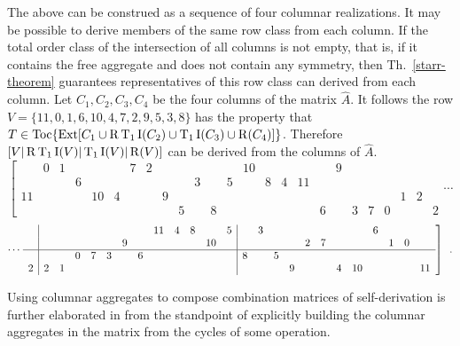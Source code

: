 \begin{example}
    The above can be construed as a sequence of four columnar realizations. It may be possible to derive members of the same row class from each column. If the total order class of the intersection of all columns is not empty, that is, if it contains the free aggregate and does not contain any symmetry, then Th.~\ref{starr-theorem} guarantees representatives of this row class can derived from each column. Let $C_1, C_2, C_3, C_4$ be the four columns of the matrix $\hat{A}$. It follows the row $V = \{ 11, 0, 1, 6, 10, 4, 7, 2, 9, 5, 3, 8 \}$ has the property that $T \in \operatorname{Toc} \{ \operatorname{Ext}[ C_1 \cup \operatorname{R}\operatorname{T}_1\operatorname{I}(C_2) \cup \operatorname{T}_1\operatorname{I}(C_3) \cup \operatorname{R}(C_4) ] \}$. Therefore $[V | \operatorname{R}\operatorname{T}_1\operatorname{I}(V) | \operatorname{T}_1\operatorname{I}(V) | \operatorname{R}(V)]$ can be derived from the columns of $\hat{A}$.
    \begin{equation*}
        \left[
        \begin{array}{cccccccccccc|cccccccccccc|c}
            & 0 & 1 &&&& 7 & 2 &&&& && 10 &&&&& 9 &&&&& & \\
            &&& 6 &&&&&&& 3 & & 5 && 8 & 4 & 11 &&&&&&& & \\
            \hline
            11 &&&& 10 & 4 &&& 9 &&& &&&&&&&&&&& 1 & 2 & \\
            &&&&&&&&& 5 && 8 &&&&&& 6 && 3 & 7 & 0 && & 2
        \end{array}
        \right. \cdots
    \end{equation*}
    \begin{equation}
        \cdots \left.
        \begin{array}{c|cccccccccccc|cccccccccccc}
            & &&&&&&& 11 & 4 & 8 && 5 && 3 &&&&&&& 6 &&& \\
            & &&&&& 9 &&&&& 10 & &&&&& 2 & 7 &&&& 1 & 0 & \\
            \hline
            & && 0 & 7 & 3 && 6 &&&&& & 8 && 5 &&&&&&&&& \\
            2 & 2 & 1 &&&&&&&&&& &&&& 9 &&& 4 & 10 &&&& 11
        \end{array} \right] \enspace.
    \end{equation}
\end{example}

Using columnar aggregates to compose combination matrices of self-derivation is further elaborated in \cite[226]{Starr1984} from the standpoint of explicitly building the columnar aggregates in the matrix from the cycles of some operation.

